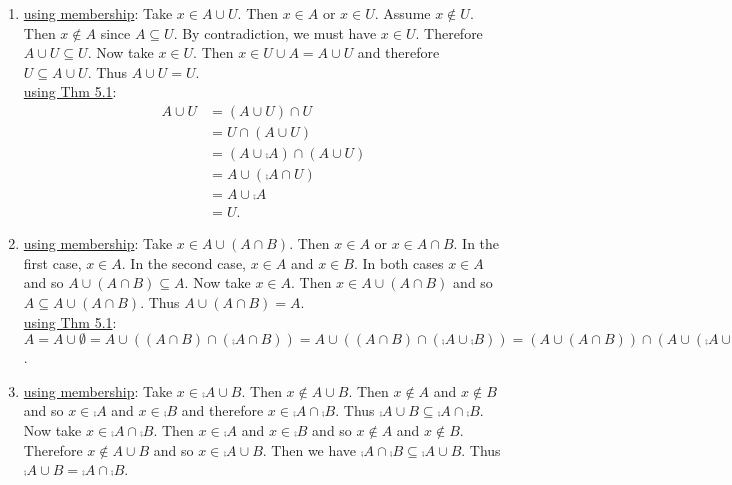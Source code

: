 \documentclass[11pt]{book}
\begin{document}
\begin{enumerate}
{\begin{enumerate}
\underline{using Thm 5.1}: \begin{align*}A \cup A &= (A \cup A) \cap U \tag{5.1.4'}\\&= (A \cap A) \cap (A \cup \comp{A})\tag{5.1.5}\\&= A \cup (A \cap \comp{A})\tag{5.1.3}\\&= A \cup \emptyset\tag{5.1.5'}\\&= A.\tag{5.1.4}\end{align*}
\item %
\underline{using membership}: Take $x \in A \cup U$. Then $x \in A$ or $x \in U$. Assume $x \notin U$. Then $x \notin A$ since $A \subseteq U$. By contradiction, we must have $x \in U$. Therefore $A \cup U \subseteq U$. Now take $x \in U$. Then $x \in U \cup A = A \cup U$ and therefore $U \subseteq A \cup U$. Thus $A \cup U = U$.\\
\underline{using Thm 5.1}: \begin{align*}A \cup U &= (A \cup U) \cap U\tag{5.1.4'}\\&= U \cap (A \cup U)\tag{5.1.2'}\\&= (A \cup \comp{A}) \cap (A \cup U)\tag{5.1.5}\\&= A \cup (\comp{A} \cap U)\tag{5.1.3}\\&= A \cup \comp{A}\tag{5.1.4'}\\&= U.\tag{5.1.5}\end{align*}
\item %
\underline{using membership}: Take $x \in A \cup (A \cap B)$. Then $x \in A$ or $x \in A \cap B$. In the first case, $x \in A$. In the second case, $x \in A$ and $x \in B$. In both cases $x \in A$ and so $A \cup (A \cap B) \subseteq A$. Now take $x \in A$. Then $x \in A \cup (A \cap B)$ and so $A \subseteq A \cup (A \cap B)$. Thus $A \cup (A \cap B) = A$.\\
\underline{using Thm 5.1}: $A = A \cup \emptyset = A \cup ((A \cap B) \cap (\comp{A \cap B})) = A \cup ((A \cap B) \cap (\comp{A} \cup \comp{B})) = (A \cup (A \cap B)) \cap (A \cup (\comp{A} \cup \comp{B})) = (A \cup (A \cap B)) \cap ((A \cup \comp{A}) \cup \comp{B}) = (A \cup (A \cap B)) \cap (U \cup \comp{B}) = (A \cup (A \cap B)) \cap (\comp{B} \cup U) = (A \cup (A \cap B)) \cap U = A \cup (A \cap B)$.
\item %
\underline{using membership}: Take $x \in \comp{A \cup B}$. Then $x \notin A \cup B$. Then $x \notin A$ and $x \notin B$ and so $x \in \comp{A}$ and $x \in \comp{B}$ and therefore $x \in \comp{A} \cap \comp{B}$. Thus $\comp{A \cup B} \subseteq \comp{A} \cap \comp{B}$. Now take $x \in \comp{A} \cap \comp{B}$. Then $x \in \comp{A}$ and $x \in \comp{B}$ and so $x \notin A$ and $x \notin B$. Therefore $x \notin A \cup B$ and so $x \in \comp{A \cup B}$. Then we have $\comp{A} \cap \comp{B} \subseteq \comp{A \cup B}$. Thus $\comp{A \cup B} = \comp{A} \cap \comp{B}$.\\

\end{enumerate}}
\end{enumerate}
\end{document}
